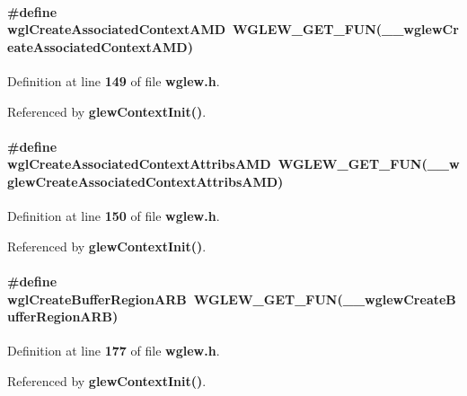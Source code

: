 \paragraph[{wgl\+Create\+Associated\+Context\+A\+MD}]{\setlength{\rightskip}{0pt plus 5cm}\#define wgl\+Create\+Associated\+Context\+A\+MD~{\bf W\+G\+L\+E\+W\+\_\+\+G\+E\+T\+\_\+\+F\+UN}({\bf \+\_\+\+\_\+wglew\+Create\+Associated\+Context\+A\+MD})}\label{wglew_8h_abb88e77121e87fadae7af0e56736ba68}


Definition at line {\bf 149} of file {\bf wglew.\+h}.



Referenced by {\bf glew\+Context\+Init()}.

\paragraph[{wgl\+Create\+Associated\+Context\+Attribs\+A\+MD}]{\setlength{\rightskip}{0pt plus 5cm}\#define wgl\+Create\+Associated\+Context\+Attribs\+A\+MD~{\bf W\+G\+L\+E\+W\+\_\+\+G\+E\+T\+\_\+\+F\+UN}({\bf \+\_\+\+\_\+wglew\+Create\+Associated\+Context\+Attribs\+A\+MD})}\label{wglew_8h_ae6efbf21cd4f4a1160acf9a0a0c5ee92}


Definition at line {\bf 150} of file {\bf wglew.\+h}.



Referenced by {\bf glew\+Context\+Init()}.

\paragraph[{wgl\+Create\+Buffer\+Region\+A\+RB}]{\setlength{\rightskip}{0pt plus 5cm}\#define wgl\+Create\+Buffer\+Region\+A\+RB~{\bf W\+G\+L\+E\+W\+\_\+\+G\+E\+T\+\_\+\+F\+UN}({\bf \+\_\+\+\_\+wglew\+Create\+Buffer\+Region\+A\+RB})}\label{wglew_8h_ab124e4b21ea3b218681115893176a263}


Definition at line {\bf 177} of file {\bf wglew.\+h}.



Referenced by {\bf glew\+Context\+Init()}.


